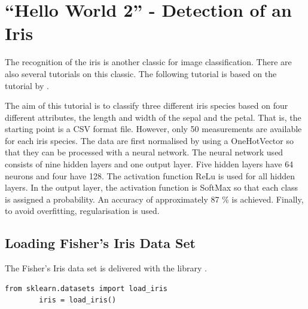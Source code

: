 \begin{code}
    
    \caption{Creation of a Convolutional Neural Network}\label{TensorFlow:Complete}
\end{code}


\section{``Hello World 2'' - Detection of an Iris}

The recognition of the iris is another classic for image classification. There are also several tutorials on this classic.  The following tutorial is based on the tutorial by \cite{KDnuggets.07.12.2020}.

The aim of this tutorial is to classify three different iris species based on four different attributes, the length and width of the sepal and the petal. That is, the starting point is a CSV format file. However, only 50 measurements are available for each iris species. The data are first normalised by using a \glqq OneHotVector\grqq{} so that they can be processed with a neural network. The neural network used consists of nine hidden layers and one output layer. Five hidden layers have 64 neurons and four have 128. The activation function ReLu is used for all hidden layers. In the output layer, the activation function is SoftMax so that each class is assigned a probability. An accuracy of approximately 87 \% is achieved. Finally, to avoid overfitting, regularisation is used.

\subsection{Loading Fisher's Iris Data Set}

The Fisher's Iris data set is delivered with the library .

\begin{code}
    \begin{lstlisting}[numbers=none]
        from sklearn.datasets import load_iris
        iris = load_iris()
    \end{lstlisting}
    \caption{Loading the data set Iris}
\end{code}

